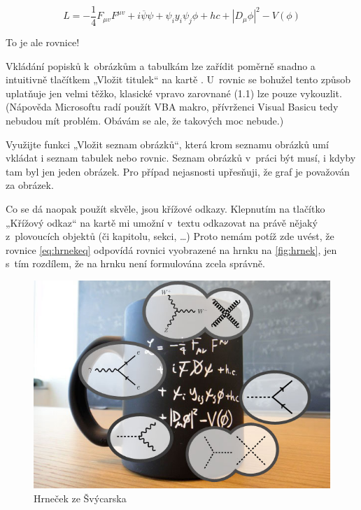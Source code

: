 \documentclass{template/socthesis}
\begin{document}
\begin{listedequation}[h]
$$L = - \frac{1}{4}F_{{\mu}v}F^{{\mu}v} + i \overline{\psi} \psi + \psi_i y_i \psi_j \phi + hc + |D_\mu\phi|^2 - V(\phi)$$
\caption{To je ale rovnice!}
\label{eq:hrnekeq}
\end{listedequation}

Vkládání popisků k~obrázkům a tabulkám lze zařídit poměrně snadno a intuitivně tlačítkem „Vložit titulek“ na kartě . U~rovnic se bohužel tento způsob uplatňuje jen velmi těžko, klasické vpravo zarovnané (1.1) lze pouze vykouzlit. (Nápověda Microsoftu radí použít VBA makro, přívrženci Visual Basicu tedy nebudou mít problém. Obávám se ale, že takových moc nebude.)

Využijte funkci „Vložit seznam obrázků“, která krom seznamu obrázků umí vkládat i seznam tabulek nebo rovnic. Seznam obrázků v~práci být musí, i kdyby tam byl jen jeden obrázek. Pro případ nejasnosti upřesňuji, že graf je považován za obrázek.

Co se dá naopak použít skvěle, jsou křížové odkazy. Klepnutím na tlačítko „Křížový odkaz“ na kartě  mi umožní v~textu odkazovat na právě nějaký z~plovoucích objektů (či kapitolu, sekci, …) Proto nemám potíž zde uvést, že rovnice \autoref{eq:hrnekeq} odpovídá rovnici vyobrazené na hrnku na \autoref{fig:hrnek}, jen s~tím rozdílem, že na hrnku není formulována zcela správně.

\begin{figure}[h]
  	\centering
 	\includegraphics[width=\textwidth]{img/hrnek.jpg}
 	\caption{Hrneček ze Švýcarska}
 	\label{fig:hrnek}
\end{figure}
\end{document}
